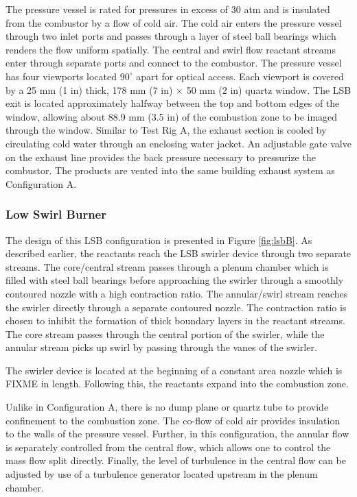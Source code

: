 The pressure vessel is rated for pressures in excess of 30 atm and is insulated from the combustor by a flow of cold air.
The cold air enters the pressure vessel through two inlet ports and passes through a layer of steel ball bearings which renders the flow uniform spatially.
The central and swirl flow reactant streams enter through separate ports and connect to the combustor.
The pressure vessel has four viewports located \(90^\circ\) apart for optical access.
Each viewport is covered by a 25 mm (1 in) thick, 178 mm (7 in) \(\times\) 50 mm (2 in) quartz window.
The LSB exit is located approximately halfway between the top and bottom edges of the window, allowing about 88.9 mm (3.5 in) of the combustion zone to be imaged through the window.
Similar to Test Rig A, the exhaust section is cooled by circulating cold water through an enclosing water jacket.
An adjustable gate valve on the exhaust line provides the back pressure necessary to pressurize the combustor.
The products are vented into the same building exhaust system as Configuration A.

\subsubsection{Low Swirl Burner}



The design of this LSB configuration is presented in Figure \ref{fig:lsbB}.
As described earlier, the reactants reach the LSB swirler device through two separate streams.
The core/central stream passes through a plenum chamber which is filled with steel ball bearings before approaching the swirler through a smoothly contoured nozzle with a high contraction ratio.
The annular/swirl stream reaches the swirler directly through a separate contoured nozzle.
The contraction ratio is chosen to inhibit the formation of thick boundary layers in the reactant streams.
The core stream passes through the central portion of the swirler, while the annular stream picks up swirl by passing through the vanes of the swirler.

The swirler device is located at the beginning of a constant area nozzle which is FIXME in length.
Following this, the reactants expand into the combustion zone.

Unlike in Configuration A, there is no dump plane or quartz tube to provide confinement to the combustion zone.
The co-flow of cold air provides insulation to the walls of the pressure vessel.
Further, in this configuration, the annular flow is separately controlled from the central flow, which allows one to control the mass flow split directly.
Finally, the level of turbulence in the central flow can be adjusted by use of a turbulence generator\cite{2011-marshall} located upstream in the plenum chamber.

